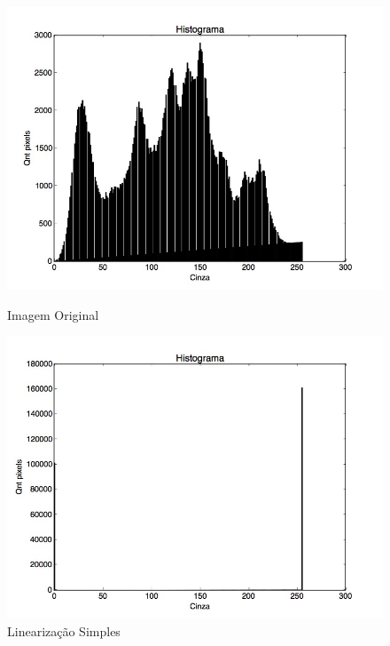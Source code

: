 \documentclass{article}
\begin{document}
\FloatBarrier
\begin{figure}[!htb]
\begin{minipage}[b]{0.45\linewidth}
\centering
\includegraphics[scale=0.25]{Histo_lena_B.jpg}
\caption{Imagem Original}
\label{fig:original}
\end{minipage}
\hspace{0.5cm}
\begin{minipage}[b]{0.45\linewidth}
\centering
\includegraphics[scale=0.25]{Histo_Linearizacao.jpg}
\caption{Linearização Simples}
\label{fig:rota}
\end{minipage}
\end{figure}
\FloatBarrier
\end{document}

